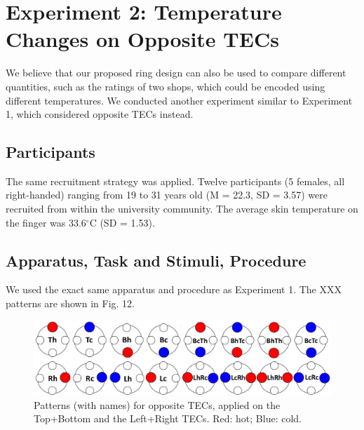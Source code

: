 \documentclass[preprint,12pt]{elsarticle}
\begin{document}
\section{Experiment 2: Temperature Changes on Opposite TECs}
We believe that our proposed ring design can also be used to compare different quantities, such as the ratings of two shops, which could be encoded using different temperatures. We conducted another experiment similar to Experiment 1, which considered opposite TECs instead.

\subsection{Participants}
The same recruitment strategy was applied. Twelve participants (5 females, all right-handed) ranging from 19 to 31 years old (M = 22.3, SD = 3.57) were recruited from within the university community. The average skin temperature on the finger was 33.6$^{\circ}$C (SD = 1.53).

\subsection{Apparatus, Task and Stimuli, Procedure}
We used the exact same apparatus and procedure as Experiment 1. The XXX patterns are shown in Fig. 12.

\begin{figure}[tp]
  \centering
  \includegraphics[width=0.9\columnwidth]{img/fig12.pdf}
  \caption{Patterns (with names) for opposite TECs, applied on the Top+Bottom and the Left+Right TECs. Red: hot; Blue: cold.}
  \label{fig:12}
\end{figure}
\end{document}
